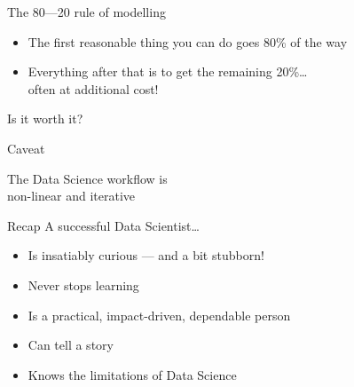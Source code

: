 \begin{frame}{The 80---20 rule of modelling}
    \begin{itemize}
        \item The first \alert{reasonable} thing you can do goes 80\% of the way
        \item Everything after that is to get the remaining 20\%\ldots \\
              often at additional cost!
    \end{itemize}
    \vfill\pause
    \begin{center}
        \LARGE%
        Is it worth it?
    \end{center}
\end{frame}

\begin{frame}{Caveat}
    \begin{center}
        {\Large%
         The Data Science workflow is} \\[\bigskipamount]
        {\LARGE%
         \alert{non\hyp{}linear} and \alert{iterative}} \\[2\bigskipamount]
    \end{center}
\end{frame}

\begin{frame}{Recap}
    A successful Data Scientist\ldots
    \begin{itemize}
        \item Is insatiably curious --- and a bit stubborn!
        \item Never stops learning
        \item Is a practical, impact\hyp{}driven, dependable person
        \item Can tell a story
        \item Knows the limitations of Data Science
    \end{itemize}
\end{frame}



